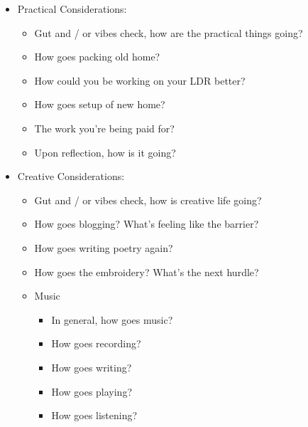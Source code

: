 \documentclass[12pt]{article}
\renewcommand{\,}{\textsuperscript{,}}
\begin{document}
\begin{itemize}

\item Practical Considerations:

\begin{itemize}

\item Gut and / or vibes check, how are the practical things going?

\item How goes packing old home?

\item How could you be working on your LDR better?

\item How goes setup of new home?

\item The work you're being paid for?

\item Upon reflection, how is it going?

\end{itemize}

\item Creative Considerations:

\begin{itemize}

\item Gut and / or vibes check, how is creative life going?

\item How goes blogging? What's feeling like the barrier?

\item How goes writing poetry again?

\item How goes the embroidery? What's the next hurdle?

\item Music

\begin{itemize}

\item In general, how goes music?

\item How goes recording?

\item How goes writing?

\item How goes playing?

\item How goes listening?


\end{itemize}
\end{itemize}
\end{itemize}
\end{document}
